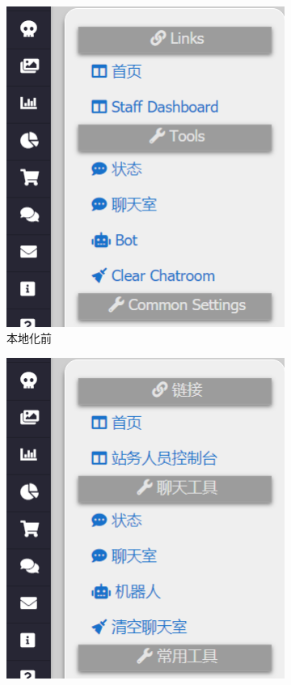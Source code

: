 \begin{figure}[h]
	\centering
    \begin{subfigure}{0.3\textwidth}
        \centering
        \includegraphics[width=\textwidth]{support-files/4.2-before-localization-cut.png}
        \caption{本地化前}
        \label{fig:beforelocal}
    \end{subfigure}
    \makebox[0.05\textwidth]{}
    \begin{subfigure}{0.3\textwidth}
        \centering
        \includegraphics[width=\textwidth]{support-files/4.2-after-localization-cut.png}

\end{subfigure}
\end{figure}
